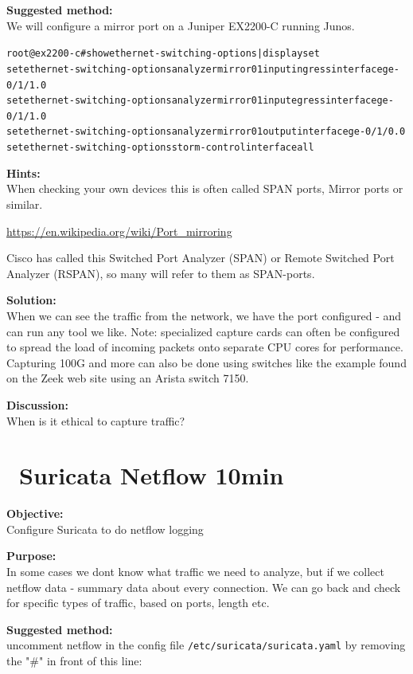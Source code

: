 \documentclass[a4paper,11pt,notitlepage]{report}
\begin{document}
{\bf Suggested method:}\\
We will configure a mirror port on a Juniper EX2200-C running Junos.

\begin{alltt}
root@ex2200-c# show ethernet-switching-options | display set
set ethernet-switching-options analyzer mirror01 input ingress interface ge-0/1/1.0
set ethernet-switching-options analyzer mirror01 input egress interface ge-0/1/1.0
set ethernet-switching-options analyzer mirror01 output interface ge-0/1/0.0
set ethernet-switching-options storm-control interface all
\end{alltt}


{\bf Hints:}\\
When checking your own devices this is often called SPAN ports, Mirror ports or similar.

\url{https://en.wikipedia.org/wiki/Port_mirroring}

Cisco has called this Switched Port Analyzer (SPAN) or Remote Switched Port Analyzer (RSPAN), so many will refer to them as SPAN-ports.

{\bf Solution:}\\
When we can see the traffic from the network, we have the port configured - and can run any tool we like. Note: specialized capture cards can often be configured to spread the load of incoming packets onto separate CPU cores for performance. Capturing 100G and more can also be done using switches like the example found on the Zeek web site using an Arista switch 7150.


{\bf Discussion:}\\
When is it ethical to capture traffic?


\chapter{\faInfoCircle\ Suricata Netflow 10min}
\label{ex:suricatanetflow}


{\bf Objective:} \\
Configure Suricata to do netflow logging


{\bf Purpose:}\\
In some cases we dont know what traffic we need to analyze, but if we collect netflow data - summary data about every connection. We can go back and check for specific types of traffic, based on ports, length etc.


{\bf Suggested method:}\\

uncomment netflow in the config file \verb+/etc/suricata/suricata.yaml+
by removing the "\#" in front of this line:
\end{document}
